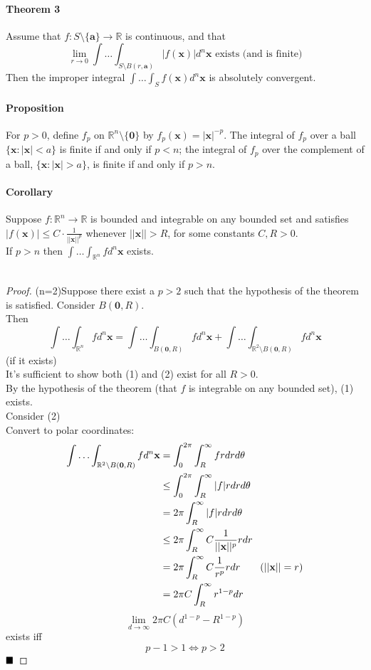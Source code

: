 \documentclass[11pt]{article}
\newcommand{\tb}[1]{\textbf{#1}}
\newcommand{\real}[0]{\mathbb{R}}
\newcommand{\vx}[0]{\tb{x}}
\newcommand{\vo}[0]{\tb{0}}
\newcommand{\qed}[0]{$\hfill\blacksquare$}
\begin{document}
\paragraph{Theorem 3} Assume that $f: S\setminus\{\tb{a}\} \rightarrow \real$ is continuous, and that
$$\underset{r \rightarrow 0}{\lim} \int \hdots \int_{S\setminus B(r, \tb{a})} |f(\vx)|d^n\vx \mbox{ exists (and is finite)}$$
Then the improper integral $\int \hdots \int_{S}f(\vx)d^n\vx$ is absolutely convergent.



\paragraph{Proposition} For $p > 0$, define $f_p$ on $\real^n \setminus \{\vo\}$ by $f_p(\vx) = |\vx|^{-p}$. The integral of $f_p$ over a ball $\{\vx:|\vx| < a\}$ is finite if and only if $p<n$; the integral of $f_p$ over the complement of a ball, $\{\vx:|\vx| > a\}$, is finite if and only if $p>n$.
\paragraph{Corollary} Suppose $f:\real^n \rightarrow \real$ is bounded and integrable on any bounded set and satisfies $|f(\vx)| \leq C \cdot \frac{1}{||\vx||^p}$ whenever $||\vx|| > R$, for some constants $C,R > 0$.\\
If $p>n$ then $\int\hdots \int_{\real^n}fd^n\vx$ exists.\\\\
\begin{proof}
(n=2)Suppose there exist a $p > 2$ such that the hypothesis of the theorem is satisfied. Consider $B(\vo,R)$.\\
Then $$\int\hdots \int_{\real^n}fd^n\vx = \int\hdots \int_{B(\vo,R)}fd^n\vx + \int\hdots \int_{\real^2 \setminus B(\vo, R)}fd^n\vx$$
(if it exists)\\
It's sufficient to show both (1) and (2) exist for all $R>0$.\\
By the hypothesis of the theorem (that $f$ is integrable on any bounded set), (1) exists.\\
Consider (2)\\
Convert to polar coordinates:
\begin{align*}
	\int\hdots \int_{\real^2 \setminus B(\vo, R)}fd^n\vx &= \int_0^{2\pi}\int_R^\infty frdrd\theta\\
	&\leq \int_0^{2\pi}\int_R^\infty|f|rdrd\theta\\
	&= 2\pi \int_R^\infty|f|rdrd\theta\\
	&\leq 2\pi \int_R^\infty C \frac{1}{||\vx||^p}rdr\\
	&= 2\pi \int_R^\infty C \frac{1}{r^p}rdr \tag{$||\vx|| = r$}\\
	&= 2\pi C\int_R^\infty r^{1-p}dr\\
\end{align*}
$$\underset{d\rightarrow\infty}{\lim}2\pi C(d^{1-p}-R^{1-p})$$ exists iff $$ p - 1> 1 \iff p>2$$ \qed
\end{proof}
\end{document}
